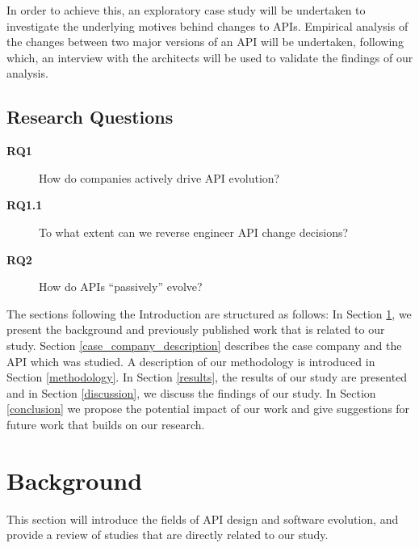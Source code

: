 \documentclass{sig-alternate}
\begin{document}
In order to achieve this, an exploratory case study will be undertaken to investigate the underlying motives behind changes to APIs. Empirical analysis of the changes between two major versions of an API will be undertaken, following which, an interview with the architects will be used to validate the findings of our analysis. 



\subsection{Research Questions} \label{rqs}
\begin{description}
\item[\textbf{RQ1}] How do companies actively drive API evolution?
\item[\textbf{RQ1.1}] To what extent can we reverse engineer API change decisions?
\item[\textbf{RQ2}] How do APIs ``passively'' evolve?


\end{description}

The sections following the Introduction are structured as follows: In Section \ref{existing_literature}, we present the background and previously published work that is related to our study. Section \ref{case_company_description} describes the case company and the API which was studied. A description of our methodology is introduced in Section \ref{methodology}. In Section \ref{results}, the results of our study are presented and in Section \ref{discussion}, we discuss the findings of our study. In Section \ref{conclusion} we propose the potential impact of our work and give suggestions for future work that builds on our research. 

\section{Background} \label{existing_literature}
This section will introduce the fields of API design and software evolution, and provide a review of studies that are directly related to our study. 
\end{document}

